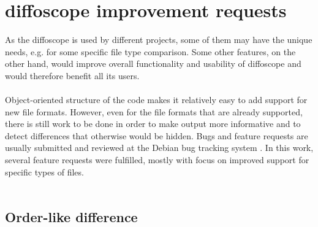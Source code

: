 \section{diffoscope improvement requests}


As the diffoscope is used by different projects, some of them may have the unique needs, e.g. for some specific file type comparison.
Some other features, on the other hand, would improve overall functionality and usability of diffoscope and would therefore benefit all its users.\\\\
Object-oriented structure of the code makes it relatively easy to add support for
new file formats.
However, even for the file formats that are already supported, there is still work
to be done in order to make output more informative and to detect differences that
otherwise would be hidden.
Bugs and feature requests are usually submitted and reviewed at the Debian bug tracking system \autocite{dfs-bugs}.
In this work, several feature requests were fulfilled, mostly with focus on improved support for specific types of files.\\\\


\subsection[Order-like difference]{Order-like difference}

